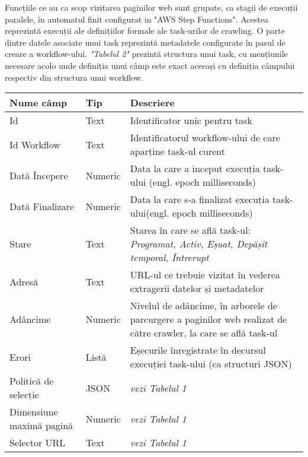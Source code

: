 Funcțiile ce au ca scop vizitarea paginilor web sunt grupate, ca stagii de execuții paralele, în automatul finit configurat in "AWS Step Functions". Acestea reprezintă execuții ale definițiilor formale ale task-urilor de crawling. O parte dintre datele asociate unui task reprezintă metadatele configurate în pasul de creare a workflow-ului. \textit{"Tabelul 2"} prezintă structura unui task, cu mențiunile necesare acolo unde definiția unui câmp este exact aceeași cu definiția câmpului respectiv din structura unui workflow.

\begin{table}[h]
	\centering
    \begin{tabular}{|M{2.5cm}|M{1.6cm}|M{9cm}|}
    	\hline 
    	Nume câmp & Tip & Descriere \\ \hline
    	
    	Id & Text & Identificator unic pentru task \\ \hline
    	
    	Id Workflow & Text & Identificatorul workflow-ului de care aparține task-ul curent \\ \hline
    	
    	Dată Începere & Numeric & Data la care a inceput execuția task-ului (engl. epoch milliseconds) \\ \hline
    	
    	Dată Finalizare & Numeric & Data la care s-a finalizat execuția task-ului(engl. epoch milliseconds) \\ \hline
    	
    	Stare & Text & Starea în care se află task-ul: \textit{Programat, Activ, Eșuat, Depășit temporal, Întrerupt} \\ \hline
    	
		Adresă & Text & URL-ul ce trebuie vizitat în vederea extragerii datelor și metadatelor \\ \hline    	
    	
    	Adâncime & Numeric & Nivelul de adâncime, în arborele de parcurgere a paginilor web realizat de către crawler, la care se află task-ul \\ \hline
    	
    	Erori & Listă & Eșecurile înregistrate în decursul execuției task-ului (ca structuri JSON) \\ \hline
    	
    	Politică de selecție & JSON & \textit{vezi Tabelul 1} \\ \hline
    	
    	Dimensiune maximă pagină & Numeric & \textit{vezi Tabelul 1} \\ \hline
    	
    	Selector URL & Text & \textit{vezi Tabelul 1} \\ \hline
    	
    \end{tabular}
\end{table}
\clearpage

